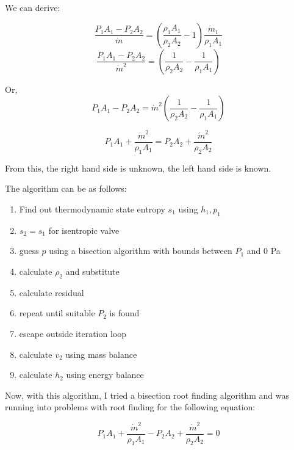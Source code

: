 \documentclass[masters]{ucbthesis}
\renewcommand{\_}{\kern-1.5pt\textunderscore\kern-1.5pt}
\begin{document}
We can derive:

\begin{equation*}
	\frac{P_1 A_1 - P_{2} A_2}{\dot{m}} =  \left( 
		\frac{\rho_1 A_1 }{\rho_{2}  A_2} - 1
	\right)
	\frac{\dot{m}_1}{\rho_1 A_1}
\end{equation*}
\begin{equation*}
	\frac{P_1 A_1 - P_{2} A_2}{\dot{m}^2} =  \left( 
		\frac{1}{\rho_{2}  A_2} - \frac{1}{\rho_1 A_1}
	\right)
\end{equation*}

Or, 
\begin{equation*}
	P_1 A_1 - P_{2} A_2 = \dot{m}^2 \left( 
		\frac{1}{\rho_{2}  A_2} - \frac{1}{\rho_1 A_1}
	\right)
\end{equation*}


\begin{equation*}
	P_1 A_1 +  
	\frac{\dot{m}^2}{\rho_1 A_1} 
	= 
	P_{2} A_2 +
	\frac{\dot{m}^2}{\rho_2 A_2}
\end{equation*}

From this, the right hand side is unknown, the left hand side is known.

The algorithm can be as follows: 

\begin{enumerate}
	\item Find out thermodynamic state entropy $s_1$ using $h_1, p_1$
	\item $s_2 = s_1$ for isentropic valve
	\item guess $p$ using a bisection algorithm with bounds between $P_1$ and $0$ Pa
	\item calculate $\rho_2$ and substitute 
	\item calculate residual 
	\item repeat until suitable $P_2$ is found
	\item escape outside iteration loop
	\item calculate $v_2$ using mass balance 
	\item calculate $h_2$ using energy balance 
\end{enumerate}

Now, with this algorithm, I tried a bisection root finding algorithm 
and was running into problems with root finding for the following equation:

\begin{equation*}
	P_1 A_1 +  
	\frac{\dot{m}^2}{\rho_1 A_1} 
	-
	P_{2} A_2 +
	\frac{\dot{m}^2}{\rho_2 A_2}
	= 0
\end{equation*}
\end{document}
